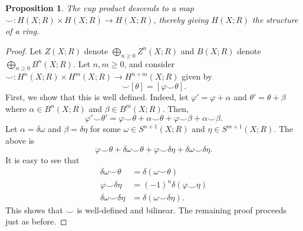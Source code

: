 \documentclass[10pt]{article}
\theoremstyle{thmstyle}
\newtheorem{proposition}[theorem]{Proposition}
\theoremstyle{defstyle}
\renewcommand{\ge}{\geqslant}
\begin{document}
\begin{proposition}
    The cup product descends to a map $\smile: H(X; R)\times H(X; R)\to H(X; R)$, thereby giving $H(X; R)$ the structure of a ring.
\end{proposition}
\begin{proof}
    Let $Z(X; R)$ denote $\displaystyle\bigoplus_{n\ge 0} Z^n(X; R)$ and $B(X; R)$ denote $\displaystyle\bigoplus_{n\ge 0} B^n(X; R)$. Let $n, m\ge 0$, and consider $\smile: H^n(X; R)\times H^m(X; R)\to H^{n + m}(X; R)$ given by
    \begin{equation*}
        [\varphi]\smile[\theta] = [\varphi\smile\theta].
    \end{equation*}
    First, we show that this is well defined. Indeed, let $\varphi' = \varphi + \alpha$ and $\theta' = \theta + \beta$ where $\alpha\in B^n(X; R)$ and $\beta\in B^m(X; R)$. Then, 
    \begin{equation*}
        \varphi'\smile\theta' = \varphi\smile\theta + \alpha\smile\theta + \varphi\smile\beta + \alpha\smile\beta.
    \end{equation*}
    Let $\alpha = \delta\omega$ and $\beta = \delta\eta$ for some $\omega\in S^{n + 1}(X; R)$ and $\eta\in S^{m + 1}(X; R)$. The above is 
    \begin{equation*}
        \varphi\smile\theta + \delta\omega\smile\theta + \varphi\smile\delta\eta + \delta\omega\smile\delta\eta.
    \end{equation*}
    It is easy to see that 
    \begin{align*}
        \delta\omega\smile\theta &= \delta(\omega\smile\theta)\\
        \varphi\smile\delta\eta &= (-1)^n\delta(\varphi\smile\eta)\\
        \delta\omega\smile\delta\eta &= \delta(\omega\smile\delta\eta).
    \end{align*}
    This shows that $\smile$ is well-defined and bilinear. The remaining proof proceeds just as before.
\end{proof}

\newpage


\end{document}
